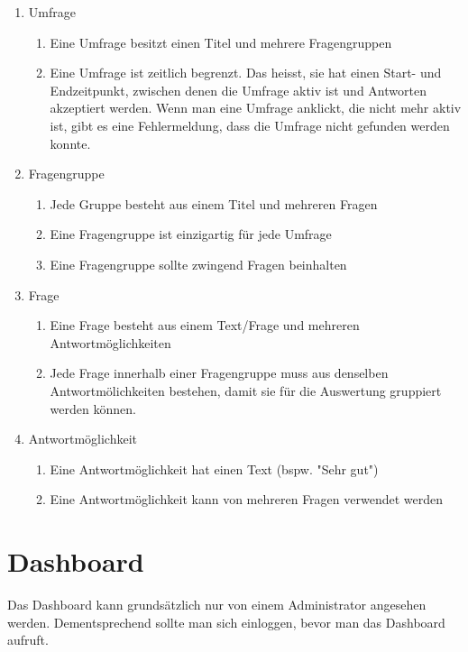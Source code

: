 \documentclass{article}
\begin{document}
\begin{enumerate}
    \item Umfrage
    \begin{enumerate}
        \item Eine Umfrage besitzt einen Titel und mehrere Fragengruppen
        \item 
            Eine Umfrage ist zeitlich begrenzt. 
            Das heisst, sie hat einen Start- und Endzeitpunkt, 
            zwischen denen die Umfrage aktiv ist und Antworten akzeptiert werden.
            Wenn man eine Umfrage anklickt, die nicht mehr aktiv ist, gibt es eine Fehlermeldung,
            dass die Umfrage nicht gefunden werden konnte.
    \end{enumerate}
    \item Fragengruppe
    \begin{enumerate}
        \item Jede Gruppe besteht aus einem Titel und mehreren Fragen
        \item Eine Fragengruppe ist einzigartig für jede Umfrage
        \item Eine Fragengruppe sollte zwingend Fragen beinhalten
    \end{enumerate}
    \item Frage
    \begin{enumerate}
        \item Eine Frage besteht aus einem Text/Frage und mehreren 
        Antwortmöglichkeiten
        \item Jede Frage innerhalb einer Fragengruppe muss aus denselben
        Antwortmölichkeiten bestehen, damit sie für die Auswertung gruppiert werden können.
    \end{enumerate}
    \item Antwortmöglichkeit
    \begin{enumerate}
        \item Eine Antwortmöglichkeit hat einen Text (bspw. "Sehr gut")
        \item Eine Antwortmöglichkeit kann von mehreren Fragen verwendet werden
    \end{enumerate}
\end{enumerate}

\pagebreak
\section{Dashboard}
Das Dashboard kann grundsätzlich nur von einem Administrator angesehen werden. 
Dementsprechend sollte man sich einloggen, bevor man das Dashboard aufruft.
\end{document}
